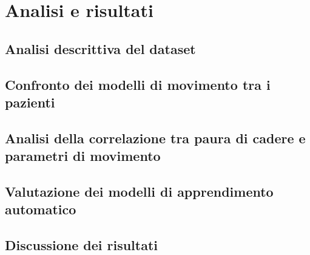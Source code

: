 \chapter{Analisi e risultati}
    \section{Analisi descrittiva del dataset}
    \section{Confronto dei modelli di movimento tra i pazienti}
    \section{Analisi della correlazione tra paura di cadere e parametri di movimento}
    \section{Valutazione dei modelli di apprendimento automatico}
    \section{Discussione dei risultati}